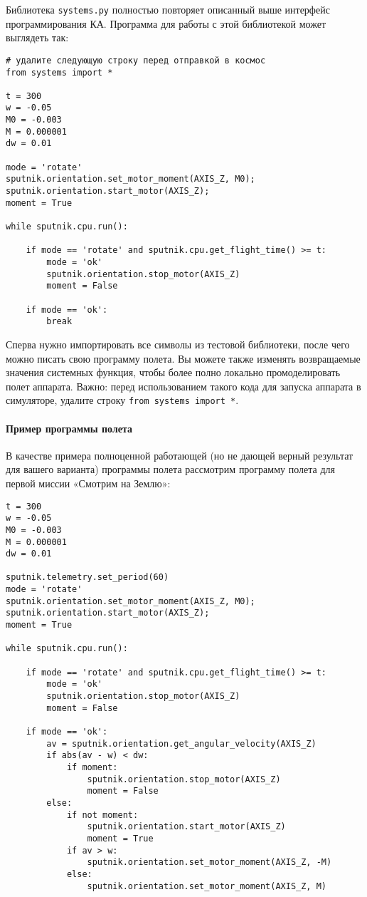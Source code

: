 \documentclass[12pt,a4paper]{article}
\begin{document}
Библиотека \verb'systems.py' полностью повторяет описанный выше интерфейс программирования
КА. Программа для работы с этой библиотекой может выглядеть так:

\begin{verbatim}
# удалите следующую строку перед отправкой в космос
from systems import *

t = 300
w = -0.05
M0 = -0.003
M = 0.000001
dw = 0.01

mode = 'rotate'
sputnik.orientation.set_motor_moment(AXIS_Z, M0);
sputnik.orientation.start_motor(AXIS_Z);
moment = True

while sputnik.cpu.run():

    if mode == 'rotate' and sputnik.cpu.get_flight_time() >= t: 
        mode = 'ok'
        sputnik.orientation.stop_motor(AXIS_Z)
        moment = False

    if mode == 'ok':
        break
\end{verbatim}
               
Сперва нужно импортировать все символы из тестовой библиотеки, после чего можно писать
свою программу полета. Вы можете также изменять возвращаемые значения системных функция,
чтобы более полно локально промоделировать полет аппарата.  Важно: перед использованием
такого кода для запуска аппарата в симуляторе, удалите строку
\verb'from systems import *'.

\paragraph{Пример программы полета}

В качестве примера полноценной работающей (но не дающей верный результат для вашего
варианта) программы полета рассмотрим программу полета для  первой миссии «Смотрим на
Землю»:

\begin{verbatim}
t = 300
w = -0.05
M0 = -0.003
M = 0.000001
dw = 0.01

sputnik.telemetry.set_period(60)
mode = 'rotate'
sputnik.orientation.set_motor_moment(AXIS_Z, M0);
sputnik.orientation.start_motor(AXIS_Z);
moment = True

while sputnik.cpu.run():

    if mode == 'rotate' and sputnik.cpu.get_flight_time() >= t: 
        mode = 'ok'
        sputnik.orientation.stop_motor(AXIS_Z)
        moment = False

    if mode == 'ok':
        av = sputnik.orientation.get_angular_velocity(AXIS_Z)
        if abs(av - w) < dw:
            if moment:
                sputnik.orientation.stop_motor(AXIS_Z)
                moment = False
        else:
            if not moment:
                sputnik.orientation.start_motor(AXIS_Z)
                moment = True
            if av > w:
                sputnik.orientation.set_motor_moment(AXIS_Z, -M)
            else:
                sputnik.orientation.set_motor_moment(AXIS_Z, M)
\end{verbatim}
\end{document}
